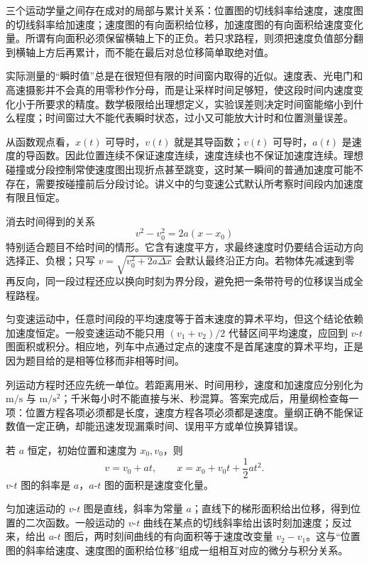 三个运动学量之间存在成对的局部与累计关系：位置图的切线斜率给速度，速度图的切线斜率给加速度；速度图的有向面积给位移，加速度图的有向面积给速度变化量。所谓有向面积必须保留横轴上下的正负。若只求路程，则须把速度负值部分翻到横轴上方后再累计，而不能在最后对总位移简单取绝对值。

实际测量的“瞬时值”总是在很短但有限的时间窗内取得的近似。速度表、光电门和高速摄影并不会真的用零秒作分母，而是让采样时间足够短，使这段时间内速度变化小于所要求的精度。数学极限给出理想定义，实验误差则决定时间窗能缩小到什么程度；时间窗过大不能代表瞬时状态，过小又可能放大计时和位置测量误差。

从函数观点看，$x(t)$ 可导时，$v(t)$ 就是其导函数；$v(t)$ 可导时，$a(t)$ 是速度的导函数。因此位置连续不保证速度连续，速度连续也不保证加速度连续。理想碰撞或分段控制常使速度图出现折点甚至跳变，这时某一瞬间的普通加速度可能不存在，需要按碰撞前后分段讨论。讲义中的匀变速公式默认所考察时间段内加速度有限且恒定。

消去时间得到的关系
\begin{equation}
 v^2-v_0^2=2a(x-x_0)
\end{equation}
特别适合题目不给时间的情形。它含有速度平方，求最终速度时仍要结合运动方向选择正、负根；只写 $v=\sqrt{v_0^2+2a\Delta x}$ 会默认最终沿正方向。若物体先减速到零再反向，同一段过程还应以换向时刻为界分段，避免把一条带符号的位移误当成全程路程。

匀变速运动中，任意时间段的平均速度等于首末速度的算术平均，但这个结论依赖加速度恒定。一般变速运动不能只用 $(v_1+v_2)/2$ 代替区间平均速度，应回到 $v$-$t$ 图面积或积分。相应地，列车中点通过定点的速度不是首尾速度的算术平均，正是因为题目给的是相等位移而非相等时间。

列运动方程时还应先统一单位。若距离用米、时间用秒，速度和加速度应分别化为 $\mathrm{m/s}$ 与 $\mathrm{m/s^2}$；千米每小时不能直接与米、秒混算。答案完成后，用量纲检查每一项：位置方程各项必须都是长度，速度方程各项必须都是速度。量纲正确不能保证数值一定正确，却能迅速发现漏乘时间、误用平方或单位换算错误。

若 $a$ 恒定，初始位置和速度为 $x_0,v_0$，则
\begin{equation}
  v=v_0+at,\qquad
  x=x_0+v_0t+\frac12at^2.
\end{equation}
$v$-$t$ 图的斜率是 $a$，$a$-$t$ 图的面积是速度变化量。

匀加速运动的 $v$-$t$ 图是直线，斜率为常量 $a$；直线下的梯形面积给出位移，得到位置的二次函数。一般运动的 $v$-$t$ 曲线在某点的切线斜率给出该时刻加速度；反过来，给出 $a$-$t$ 图后，两时刻间曲线的有向面积等于速度改变量 $v_2-v_1$。这与“位置图的斜率给速度、速度图的面积给位移”组成一组相互对应的微分与积分关系。

